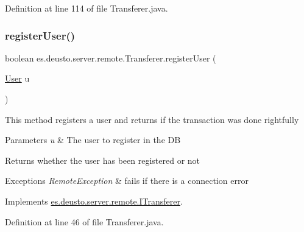 Definition at line 114 of file Transferer.\+java.

\mbox{\label{classes_1_1deusto_1_1server_1_1remote_1_1_transferer_a80e2dd7db595bdd8d39969e5d0e8ae7b}} 
\subsubsection{\texorpdfstring{register\+User()}{registerUser()}}
{\footnotesize\ttfamily boolean es.\+deusto.\+server.\+remote.\+Transferer.\+register\+User (\begin{DoxyParamCaption}\item[{\hyperlink{classes_1_1deusto_1_1server_1_1db_1_1data_1_1_user}{User}}]{u }\end{DoxyParamCaption})}

This method registers a user and returns if the transaction was done rightfully 
\begin{DoxyParams}{Parameters}
{\em u} & The user to register in the DB \\
\hline
\end{DoxyParams}
\begin{DoxyReturn}{Returns}
whether the user has been registered or not 
\end{DoxyReturn}

\begin{DoxyExceptions}{Exceptions}
{\em Remote\+Exception} & fails if there is a connection error \\
\hline
\end{DoxyExceptions}


Implements \hyperlink{interfacees_1_1deusto_1_1server_1_1remote_1_1_i_transferer_ab805207e578865de5bf2e69ca8942344}{es.\+deusto.\+server.\+remote.\+I\+Transferer}.



Definition at line 46 of file Transferer.\+java.

\mbox{\label{classes_1_1deusto_1_1server_1_1remote_1_1_transferer_ad6759f696eddd682b750f92ec41d1fcb}} 
